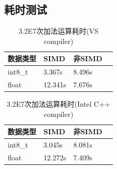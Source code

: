 \documentclass{article}
\begin{document}
\subsection{耗时测试}
\begin{table}[H]
	\caption{3.2E7次加法运算耗时(VS compiler)}
	\centering
	\begin{tabular}{|l|l|l|l|}%
		\hline  %
		数据类型 & SIMD		& 非SIMD  \\
		\hline
		int8\_t	& 3.367s	& 8.496s \\
		\hline
		float	& 12.341s	& 7.676s \\
		\hline  %
	\end{tabular}
\end{table}
\begin{table}[H]
	\caption{3.2E7次加法运算耗时(Intel C++ compiler)}
	\centering
	\begin{tabular}{|l|l|l|l|}%
		\hline  %
		数据类型 & SIMD		& 非SIMD  \\
		\hline
		int8\_t	& 3.045s	& 8.081s \\
		\hline
		float	& 12.272s	& 7.409s \\
		\hline  %
	\end{tabular}
\end{table}



\end{document}
